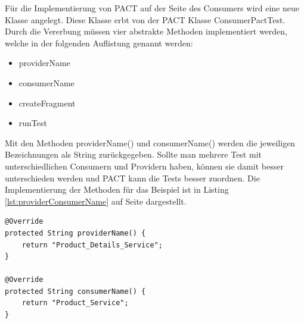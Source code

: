 \documentclass{llncs}
\begin{document}
Für die Implementierung von PACT auf der Seite des Consumers wird eine neue Klasse angelegt. Diese Klasse erbt von der PACT Klasse ConsumerPactTest. Durch die Vererbung müssen vier abstrakte Methoden implementiert werden, welche in der folgenden Auflistung genannt werden:
\begin{itemize}
\item providerName
\item consumerName
\item createFragment
\item runTest
\end{itemize}


Mit den Methoden providerName() und consumerName() werden die jeweiligen Bezeichnungen als String zurückgegeben. Sollte man mehrere Test mit unterschiedlichen Consumern und Providern haben, können sie damit besser unterschieden werden und PACT kann die Tests besser zuordnen. Die Implementierung der Methoden für das Beispiel ist in Listing \ref{lst:providerConsumerName} auf Seite  \pageref{lst:providerConsumerName} dargestellt.
\lstset{language = Java}
\begin{lstlisting}[caption=Implementierung von providerName() und consumerName(),label=lst:providerConsumerName]
@Override
protected String providerName() {
    return "Product_Details_Service";
}

@Override
protected String consumerName() {
    return "Product_Service";
}
\end{lstlisting}
\end{document}
